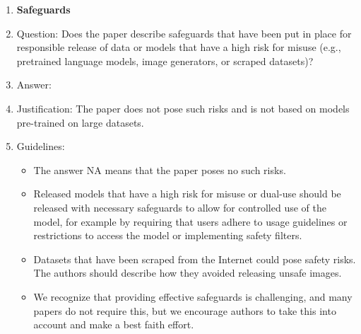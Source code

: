 \documentclass{article}
\begin{document}
\begin{enumerate}
\begin{itemize}
        \item The authors should consider possible harms that could arise when the technology is being used as intended and functioning correctly, harms that could arise when the technology is being used as intended but gives incorrect results, and harms following from (intentional or unintentional) misuse of the technology.
        \item If there are negative societal impacts, the authors could also discuss possible mitigation strategies (e.g., gated release of models, providing defenses in addition to attacks, mechanisms for monitoring misuse, mechanisms to monitor how a system learns from feedback over time, improving the efficiency and accessibility of ML).
    \end{itemize}
    
\item {\bf Safeguards}
    \item[] Question: Does the paper describe safeguards that have been put in place for responsible release of data or models that have a high risk for misuse (e.g., pretrained language models, image generators, or scraped datasets)?
    \item[] Answer: \answerNA{} %
    \item[] Justification: The paper does not pose such risks and is not based on models pre-trained on large datasets.
     
    \item[] Guidelines:
    \begin{itemize}
        \item The answer NA means that the paper poses no such risks.
        \item Released models that have a high risk for misuse or dual-use should be released with necessary safeguards to allow for controlled use of the model, for example by requiring that users adhere to usage guidelines or restrictions to access the model or implementing safety filters. 
        \item Datasets that have been scraped from the Internet could pose safety risks. The authors should describe how they avoided releasing unsafe images.
        \item We recognize that providing effective safeguards is challenging, and many papers do not require this, but we encourage authors to take this into account and make a best faith effort.
    \end{itemize}


\end{enumerate}
\end{document}
